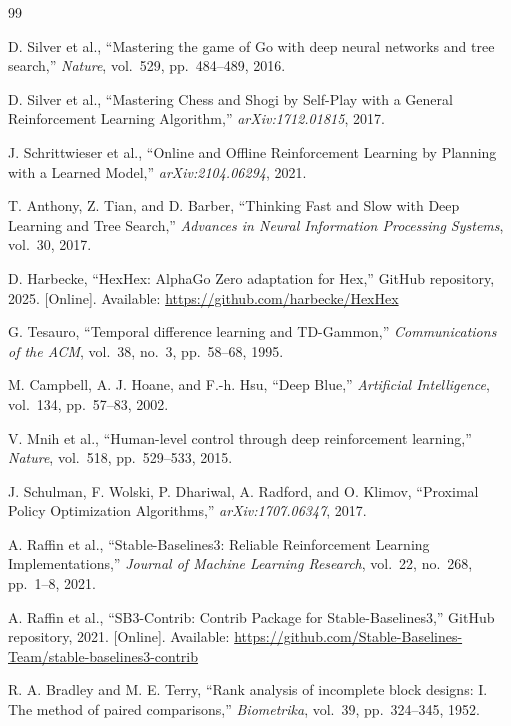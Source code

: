 \documentclass[conference]{IEEEtran}
\begin{document}
\begin{thebibliography}{99}

D. Silver et al., ``Mastering the game of Go with deep neural networks and tree
search,'' \textit{Nature}, vol.\ 529, pp.\ 484--489, 2016.

D. Silver et al., ``Mastering Chess and Shogi by Self-Play with a General
Reinforcement Learning Algorithm,'' \textit{arXiv:1712.01815}, 2017.

J. Schrittwieser et al., ``Online and Offline Reinforcement Learning by Planning
with a Learned Model,'' \textit{arXiv:2104.06294}, 2021.

T. Anthony, Z. Tian, and D. Barber, ``Thinking Fast and Slow with Deep Learning
and Tree Search,'' \textit{Advances in Neural Information Processing Systems},
vol.\ 30, 2017.

D. Harbecke, ``HexHex: AlphaGo Zero adaptation for Hex,'' GitHub repository,
2025. [Online]. Available: \url{https://github.com/harbecke/HexHex}

G. Tesauro, ``Temporal difference learning and TD-Gammon,''
\textit{Communications of the ACM}, vol.\ 38, no.\ 3, pp.\ 58--68, 1995.

M. Campbell, A. J. Hoane, and F.-h. Hsu, ``Deep Blue,'' \textit{Artificial
Intelligence}, vol.\ 134, pp.\ 57--83, 2002.

V. Mnih et al., ``Human-level control through deep reinforcement learning,''
\textit{Nature}, vol.\ 518, pp.\ 529--533, 2015.

J. Schulman, F. Wolski, P. Dhariwal, A. Radford, and O. Klimov, ``Proximal
Policy Optimization Algorithms,'' \textit{arXiv:1707.06347}, 2017.

A. Raffin et al., ``Stable-Baselines3: Reliable Reinforcement Learning
Implementations,'' \textit{Journal of Machine Learning Research}, vol.\ 22,
no.\ 268, pp.\ 1--8, 2021.

A. Raffin et al., ``SB3-Contrib: Contrib Package for Stable-Baselines3,''
GitHub repository, 2021. [Online]. Available:
\url{https://github.com/Stable-Baselines-Team/stable-baselines3-contrib}

R. A. Bradley and M. E. Terry, ``Rank analysis of incomplete block designs:
I. The method of paired comparisons,'' \textit{Biometrika}, vol.\ 39,
pp.\ 324--345, 1952.


\end{thebibliography}
\end{document}
